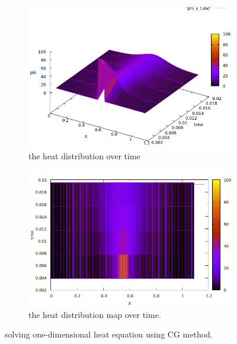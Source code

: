 \begin{figure}
     \centering
     \begin{subfigure}[b]{0.45\textwidth}
         \centering
         \includegraphics[width=\textwidth]{1Dfig/result1D_CG-2}
		\caption{the heat distribution over time}
		\label{fig:1d-t-CG-2}
     \end{subfigure}
     \hfill
     \begin{subfigure}[b]{0.45\textwidth}
         \centering
         \includegraphics[width=\textwidth]{1Dfig/result1D_CG-2-map}
		\caption{the heat distribution map over time.}
	\label{fig:1d-t-CG-2-map}
     \end{subfigure}
     
        \caption{solving one-dimensional heat equation using CG method.}
        \label{fig:1d-CG}
\end{figure}




